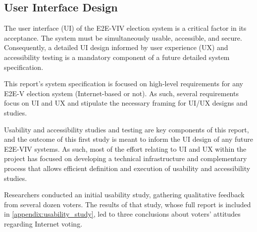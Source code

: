 \subsection{User Interface Design}
\label{sec:user-interf-design}

The user interface (UI) of the E2E-VIV election system is a critical
factor in its acceptance. The system must be simultaneously usable,
accessible, and secure. Consequently, a detailed UI design informed by
user experience (UX) and accessibility testing is a mandatory
component of a future detailed system specification.

This report’s system specification is focused on high-level
requirements for any E2E-V election system (Internet-based or not). As
such, several requirements focus on UI and UX and stipulate the
necessary framing for UI/UX designs and studies.

Usability and accessibility studies and testing are key components of
this report, and the outcome of this first study is meant to inform
the UI design of any future E2E-VIV systems. As such, most of the
effort relating to UI and UX within the project has focused on
developing a technical infrastructure and complementary process that
allows efficient definition and execution of usability and
accessibility studies.

Researchers conducted an initial usability study, gathering
qualitative feedback from several dozen voters. The results of that
study, whose full report is included in
\autoref{appendix:usability_study}, led to three conclusions about
voters’ attitudes regarding Internet voting.

